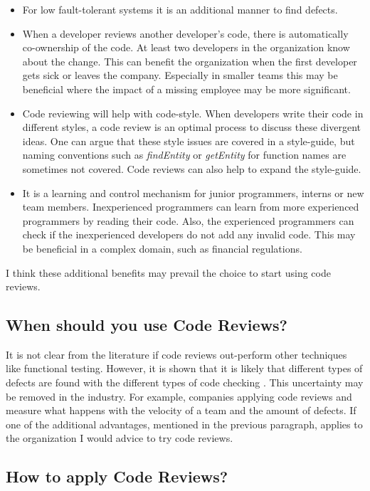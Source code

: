 \begin{itemize}
\setlength\itemsep{0em}
\item
For low fault-tolerant systems it is an additional manner to find defects.
\item
When a developer reviews another developer's code, there is automatically co-ownership of the code.
At least two developers in the organization know about the change.
This can benefit the organization when the first developer gets sick or leaves the company.
Especially in smaller teams this may be beneficial where the impact of a missing employee may be more significant.
\item
Code reviewing will help with code-style. When developers write their code in different styles, a code review is an optimal process to discuss these divergent ideas.
One can argue that these style issues are covered in a style-guide, but naming conventions such as \textit{findEntity} or \textit{getEntity} for function names are sometimes not covered.
Code reviews can also help to expand the style-guide.
\item
It is a learning and control mechanism for junior programmers, interns or new team members.
Inexperienced programmers can learn from more experienced programmers by reading their code.
Also, the experienced programmers can check if the inexperienced developers do not add any invalid code.
This may be beneficial in a complex domain, such as financial regulations.
\end{itemize}

I think these additional benefits may prevail the choice to start using code reviews.

\subsection*{When should you use Code Reviews?}

It is not clear from the literature if code reviews out-perform other techniques like functional testing.
However, it is shown that it is likely that different types of defects are found with the different types of code checking \autocite{Juristo2003}.
This uncertainty may be removed in the industry. For example, companies applying code reviews and measure what happens with the velocity of a team and the amount of defects.
If one of the additional advantages, mentioned in the previous paragraph, applies to the organization I would advice to try code reviews.

\subsection*{How to apply Code Reviews?}


